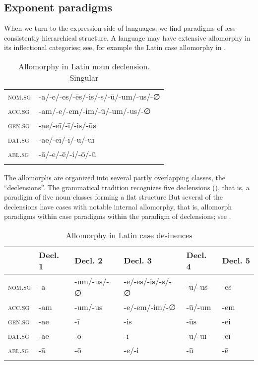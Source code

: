 \documentclass[output=paper, colorlinks,citecolor=brown]{langsci/langscibook}
\begin{document}
\subsection{Exponent paradigms} \label{exponent_paradigm}

When we turn to the expression side of languages, we find paradigms of less consistently hierarchical structure. A language may have extensive allomorphy in its inflectional categories; see, for example the Latin case allomorphy in . 

\begin{table}
\caption{Allomorphy in Latin noun declension. Singular\label{tab:andersen_2}}
\begin{tabular}{>{\scshape}ll}
\lsptoprule
nom.sg & -a/-e/-es/-ēs/-is/-s/-ū/-um/-us/-∅\\
acc.sg & -am/-e/-em/-im/-ū/-um/-us/-∅\\
gen.sg & -ae/-eī/-ī/-is/-ūs\\
dat.sg & -ae/-eī/-ī/-u/-uī\\
abl.sg & -ā/-e/-ē/-i/-ō/-ū\\
\lspbottomrule
\end{tabular}
\end{table}


The allomorphs are organized into several partly overlapping classes, the  ``declensions''. The grammatical tradition recognizes five declensions (), that is, a paradigm of five noun classes forming a flat structure But several of the declensions have cases with notable internal allomorphy, that is, allomorph paradigms within case paradigms within the paradigm of declensions; see . 

\begin{table}
\caption{Allomorphy in Latin case desinences\label{tab:andersen_3}}
\begin{tabular}{>{\scshape}llllll}
\lsptoprule
& Decl. 1 & Decl. 2 & Decl. 3 & Decl. 4 & Decl. 5\\\midrule
nom.sg & {}-a & {}-um/-us/-∅ & {}-e/-es/-is/-s/-∅ & {}-ū/-us & {}-ēs\\
acc.sg & {}-am & {}-um/-us & {}-e/-em/-im/-∅ & {}-ū/-um & {}-em\\
gen.sg & {}-ae & {}-ī & {}-is & {}-ūs & {}-ei\\
dat.sg & {}-ae & {}-ō & {}-ī & {}-u/-uī & {}-eī\\
abl.sg & {}-ā & {}-ō & {}-e/-i & {}-ū & {}-ē\\
\lspbottomrule
\end{tabular}
\end{table}
\end{document}
